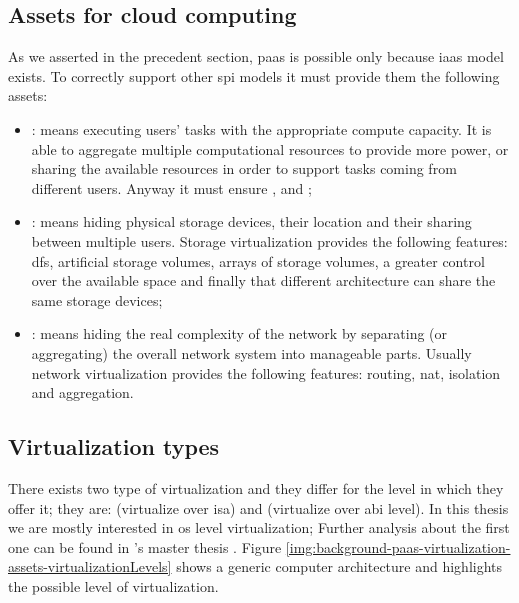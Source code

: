 \subsection{Assets for cloud computing}
\label{sec:background-virtualization-assets}
As we asserted in the precedent section, \ac{paas} is possible only because \ac{iaas} model exists.
To correctly support other \ac{spi} models it must provide them the following assets:

\begin{itemize}
	\item{: means executing users' tasks with the appropriate compute capacity. It is
		able to aggregate multiple computational resources to provide more power, or sharing the available
		resources in order to support tasks coming from different users. Anyway it must ensure
		,  and ;}
	\item{: means hiding physical storage devices, their location and their sharing between
		multiple users. Storage virtualization provides the following features: \ac{dfs},
		artificial storage volumes, arrays of storage volumes, a greater control over the available space and
		finally that different architecture can share the same storage devices;}
	\item{: means hiding the real complexity of the network by separating (or aggregating)
		the overall network system into manageable parts. Usually network virtualization provides the 
		following features: routing, \ac{nat}, isolation and aggregation.}
\end{itemize}

\subsection{Virtualization types}
\label{sec:background-virtualization-types}
There exists two type of virtualization and they differ for the level in which they offer it; they
are:  (virtualize over \ac{isa}) and  (virtualize over \ac{abi} level). In this thesis we are mostly interested in \acs{os}
level virtualization; Further analysis about the first one can be found in \citeauthor{gardimanThesis}'s
master thesis \cite{gardimanThesis}.
Figure \ref{img:background-paas-virtualization-assets-virtualizationLevels}
shows a generic computer architecture and highlights the possible level of virtualization.

